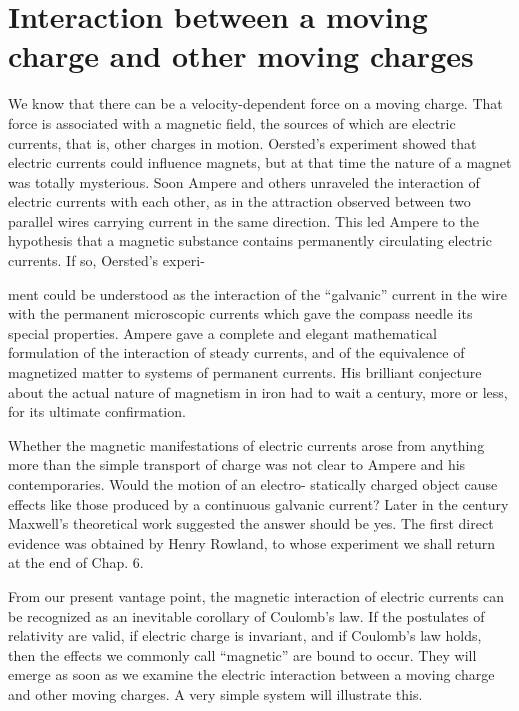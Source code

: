 \iffalse

\section{Interaction between a moving charge and other moving charges}

We know that there can be a velocity-dependent force on a moving
charge. That force is associated with a magnetic field, the sources of
which are electric currents, that is, other charges in motion.
Oersted's experiment showed that electric currents could influence
magnets, but at that time the nature of a magnet was totally
mysterious. Soon Ampere and others unraveled the interaction of
electric currents with each other, as in the attraction observed between
two parallel wires carrying current in the same direction. This
led Ampere to the hypothesis that a magnetic substance contains
permanently circulating electric currents. If so, Oersted's experi-

ment could be understood as the interaction of the ``galvanic'' current
in the wire with the permanent microscopic currents which gave
the compass needle its special properties. Ampere gave a complete
and elegant mathematical formulation of the interaction of steady
currents, and of the equivalence of magnetized matter to systems of
permanent currents. His brilliant conjecture about the actual nature
of magnetism in iron had to wait a century, more or less, for its
ultimate confirmation.

Whether the magnetic manifestations of electric currents arose
from anything more than the simple transport of charge was not clear
to Ampere and his contemporaries. Would the motion of an electro-
statically charged object cause effects like those produced by a continuous
galvanic current? Later in the century Maxwell's theoretical
work suggested the answer should be yes. The first direct evidence
was obtained by Henry Rowland, to whose experiment we shall return
at the end of Chap. 6.

From our present vantage point, the magnetic interaction of
electric currents can be recognized as an inevitable corollary
of Coulomb's law. If the postulates of relativity are valid, if electric
charge is invariant, and if Coulomb's law holds, then the effects we
commonly call ``magnetic'' are bound to occur. They will emerge as
soon as we examine the electric interaction between a moving charge
and other moving charges. A very simple system will illustrate this.

